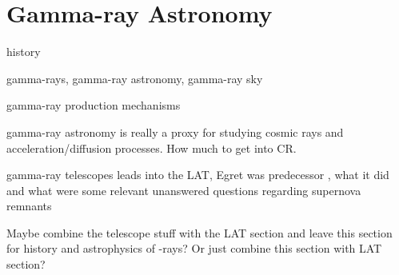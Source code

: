 \chapter{Gamma-ray Astronomy}
\label{chap:gamAstr}
history

gamma-rays, gamma-ray astronomy, gamma-ray sky

gamma-ray production mechanisms

gamma-ray astronomy is really a proxy for studying cosmic rays and acceleration/diffusion processes. How much to get into CR. 

gamma-ray telescopes leads into the LAT, Egret was  predecessor , what it did and what were some relevant unanswered questions regarding supernova remnants 
    
Maybe combine the telescope stuff  with the LAT section and leave this section for history and astrophysics of \g-rays? Or just combine this section with  LAT section?
